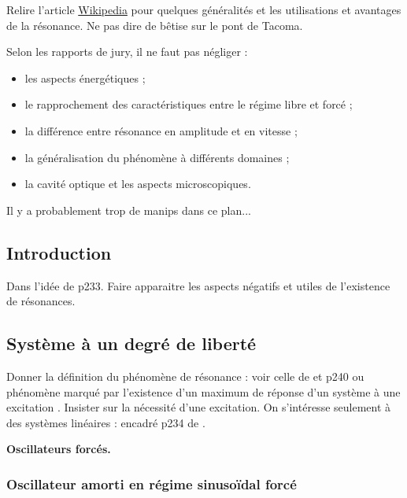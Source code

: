 \begin{remarque}
Relire l'article \href{https://fr.wikipedia.org/wiki/R\%C3\%A9sonance}{Wikipedia} pour quelques généralités et les utilisations et avantages de la résonance.
Ne pas dire de bêtise sur le pont de Tacoma.

\noindent
Selon les rapports de jury, il ne faut pas négliger :
\begin{itemize}
\item les aspects énergétiques ;
\item le rapprochement des caractéristiques entre le régime libre et forcé ;
\item la différence entre résonance en amplitude et en vitesse ;
\item la généralisation du phénomène à différents domaines ;
\item la cavité optique et les aspects microscopiques.
\end{itemize}

\noindent
Il y a probablement trop de manips dans ce plan...
\end{remarque}

\subsection*{Introduction}

Dans l'idée de \cite{Michel2017} p233.
Faire apparaitre les aspects négatifs et utiles de l'existence de résonances.

\subsection{Système à un degré de liberté}

Donner la définition du phénomène de résonance : voir celle de \cite{Taillet2018} et \cite{Michel2017} p240 ou \og phénomène marqué par l'existence d'un maximum de réponse d'un système à une excitation \fg{}.
Insister sur la nécessité d'une excitation.
On s'intéresse seulement à des systèmes linéaires : encadré p234 de \cite{Michel2017}.

\begin{slide}
\textbf{Oscillateurs forcés.}
\end{slide}

\subsubsection{Oscillateur amorti en régime sinusoïdal forcé}

